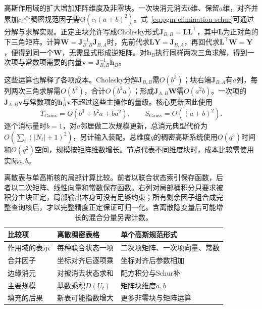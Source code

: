 高斯作用域的扩大增加矩阵维度及非零块。一次块消元消去$b$维、保留$a$维，对齐并累加$c_t$个稠密规范因子需$O(c_t(a+b)^2)$。式~\eqref{eq:pgm-elimination-schur}可通过分解与求解实现。正定主块允许写成Cholesky形式$\bm{J}_{B,B}=\bm{L}\bm{L}^{\top}$，其中$\bm{L}$为正对角的下三角矩阵。计算$\bm{W}=\bm{J}_{B,B}^{-1}\bm{J}_{B,A}$时，先前代求$\bm{L}\bm{Y}=\bm{J}_{B,A}$，再回代求$\bm{L}^{\top}\bm{W}=\bm{Y}$，便得到同一个$\bm{W}$，无需显式形成逆矩阵。对$\bm{h}_B$执行同样两次三角求解，得到一次项与常数项需要的向量$\bm{v}=\bm{J}_{B,B}^{-1}\bm{h}_B$。

这些运算也解释了各项成本。Cholesky分解$\bm{J}_{B,B}$需$O(b^3)$；块右端$\bm{J}_{B,A}$有$a$列，每列两次三角求解需$O(b^2)$，合计$O(b^2a)$；形成$\bm{J}_{A,B}\bm{W}$需$O(a^2b)$。一次项的$\bm{J}_{A,B}\bm{v}$与常数项的$\bm{h}_B^\top\bm{v}$不超过这些主操作的量级。核心更新因此使用
\begin{equation}
  T_{\mathrm{Gauss}}
  =O(b^3+b^2a+ba^2),\qquad
  S_{\mathrm{Gauss}}=O((a+b)^2).
  \label{eq:pgm-elimination-gaussian-cost}
\end{equation}
逐个消标量时$b=1$，对$a$邻居做二次规模更新，总消元典型代价为$O(\sum_t(|N_t|+1)^2)$，另计输入装配。总维度$q$的稠密高斯系统使用$O(q^3)$时间和$O(q^2)$空间，规模按矩阵维数增长。节点代表不同维度块时，成本比较需使用实际$a,b$。

\begin{table}[htbp]
  \centering
  \begin{tabularx}{\linewidth}{@{}lXX@{}}
    \toprule
    比较项 & 离散稠密表格 & 单个高斯规范形式\\
    \midrule
    作用域的表示 & 每种联合状态一项 & 二次项矩阵、一次项向量、常数\\
    合并因子 & 坐标对齐后逐项乘 & 坐标对齐后参数相加\\
    边缘消元 & 对被消去状态求和 & 配方积分与Schur补\\
    主要规模 & 基数乘积$D(U_t)$ & 矩阵块维度$a,b$\\
    填充的后果 & 新表可能指数增大 & 更多非零块与矩阵运算\\
    \bottomrule
  \end{tabularx}
  \caption{离散表与单高斯核的局部计算比较。前者以联合状态索引保存函数，后者以二次矩阵、线性向量和常数保存函数。右列对局部桶积分只要求被积分主块正定，局部输出本身可没有足够约束；所有剩余因子组合成完整查询核后，才以完整精度正定保证可归一化。含离散隐变量后可能增长的混合分量另需计数。}
  \label{tab:pgm-elimination-representation-cost}
\end{table}

